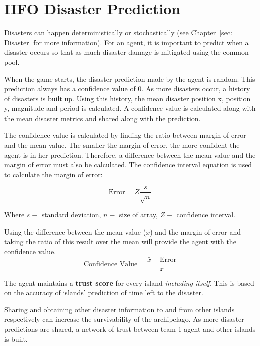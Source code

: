 \section{IIFO Disaster Prediction}
Disasters can happen deterministically or stochastically (see Chapter~\ref{sec: Disaster} for more information). For an agent, it is important to predict when a disaster occurs so that as much disaster damage is mitigated using the common pool.

When the game starts, the disaster prediction made by the agent is random. This prediction always has a confidence value of 0. As more disasters occur, a history of disasters is built up. Using this history, the mean disaster position x, position y, magnitude and period is calculated. A confidence value is calculated along with the mean disaster metrics and shared along with the prediction.

The confidence value is calculated by finding the ratio between margin of error and the mean value. The smaller the margin of error, the more confident the agent is in her prediction. Therefore, a difference between the mean value and the margin of error must also be calculated. The confidence interval equation  is used to calculate the margin of error:

\begin{equation}
    \label{eq: Team1MarginOfError}
    \text{Error} = Z \dfrac{s}{\sqrt{n}}
\end{equation}

Where $s \equiv$ standard deviation, $n \equiv$ size of array, $Z \equiv$ confidence interval.

Using the difference between the mean value ($\bar{x}$) and the margin of error and taking the ratio of this result over the mean will provide the agent with the confidence value.
\begin{equation}
    \text{Confidence Value} = \frac{\bar{x} - \text{Error}}{\bar{x}}
\end{equation}

The agent maintains a \textbf{trust score} for every island \emph{including itself}. This is based on the accuracy of islands' prediction of time left to the disaster.

Sharing and obtaining other disaster information to and from other islands respectively can increase the survivability of the archipelago. As more disaster predictions are shared, a network of trust between team 1 agent and other islands is built.

